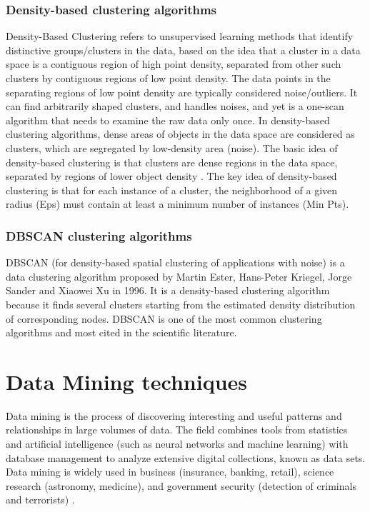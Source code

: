 \subsubsection{Density-based clustering algorithms}
\label{subsub:density_based_c}
Density-Based Clustering refers to  unsupervised learning methods that identify distinctive groups/clusters in the data, based on the idea that a cluster in a data space is a contiguous region of high point density, separated from other such clusters by contiguous regions of low point density. The data points in the separating regions of low point density are typically considered noise/outliers.
It can find arbitrarily shaped clusters, and handles noises, and yet is a one-scan algorithm that needs to examine the raw data only once. In density-based clustering algorithms, dense areas of objects in the data space are considered as clusters, which are segregated by low-density area (noise). The basic idea of density-based clustering is that clusters are dense regions in the data space, separated by regions of lower object density .
The key idea of density-based clustering is that for each instance of a cluster, the neighborhood of a given radius (Eps) must contain at least a minimum number of instances (Min Pts).

\subsubsection{DBSCAN clustering algorithms}
\label{subsub:dbscan}
DBSCAN (for density-based spatial clustering of applications with noise) is a data clustering algorithm proposed by Martin Ester, Hans-Peter Kriegel, Jorge Sander and Xiaowei Xu in 1996. It is a density-based clustering algorithm because it finds several clusters starting from the estimated density distribution of corresponding nodes. DBSCAN \cite{Kisilevich2010PDBSCANAD} is one of the most common clustering algorithms and most cited in the scientific literature.

\section{Data Mining techniques}

Data mining is the process of discovering interesting and useful patterns and relationships in large volumes of data. The field combines tools from statistics and artificial intelligence (such as neural networks and machine learning) with database management to analyze extensive digital collections, known as data sets. Data mining is widely used in business (insurance, banking, retail), science research (astronomy, medicine), and government security (detection of criminals and terrorists) \cite{Okonkwo2011COMBATINGCA}. 

